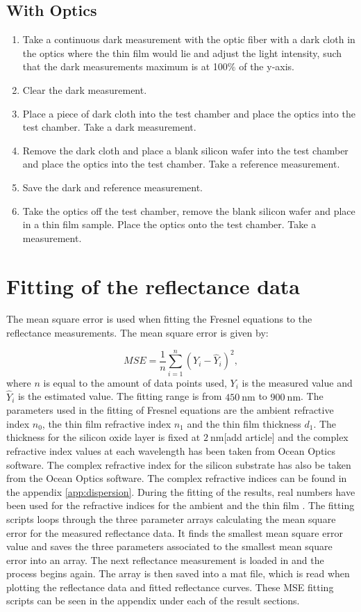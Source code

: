 \documentclass[MasterThesisMain.tex]{subfiles}
\begin{document}
\subsection{With Optics}
\begin{enumerate}
\item Take a continuous dark measurement with the optic fiber with a dark cloth in the optics where the thin film would lie and adjust the light intensity, such that the dark measurements maximum is at 100$\%$ of the y-axis.
\item Clear the dark measurement.
\item Place a piece of dark cloth into the test chamber and place the optics into the test chamber. Take a dark measurement.
\item Remove the dark cloth and place a blank silicon wafer into the test chamber and place the optics into the test chamber. Take a reference measurement.
\item Save the dark and reference measurement.
\item Take the optics off the test chamber, remove the blank silicon wafer and place in a thin film sample. Place the optics onto the test chamber. Take a measurement.
\end{enumerate}

\section{Fitting of the reflectance data} \label{sec:fitting}
The mean square error is used when fitting the Fresnel equations to the reflectance measurements. The mean square error is given by:

\begin{equation}
MSE = \frac{1}{n}\sum_{i=1}^{n}\left( Y_i - \hat{Y}_i \right)^2,
\end{equation} 
where $n$ is equal to the amount of data points used, $Y_i$ is the measured value and $\hat{Y}_i$ is the estimated value. The fitting range is from $\SI{450}{\nano\meter}$ to $\SI{900}{\nano\meter}$. The parameters used in the fitting of Fresnel equations are the ambient refractive index $n_0$, the thin film refractive index $n_1$ and the thin film thickness $d_1$. The thickness for the silicon oxide layer is fixed at $\SI{2}{\nano\meter}$[add article] and the complex refractive index values at each wavelength has been taken from Ocean Optics software. The complex refractive index for the silicon substrate has also be taken from the Ocean Optics software. The complex refractive indices can be found in the appendix \ref{app:dispersion}. During the fitting of the results, real numbers have been used for the refractive indices for the ambient and the thin film . The fitting scripts loops through the three parameter arrays calculating the mean square error for the measured reflectance data. It finds the smallest mean square error value and saves the three parameters associated to the smallest mean square error into an array. The next reflectance measurement is loaded in and the process begins again. The array is then saved into a mat file, which is read when plotting the reflectance data and fitted reflectance curves. These MSE fitting scripts can be seen in the appendix under each of the result sections.
\end{document}
